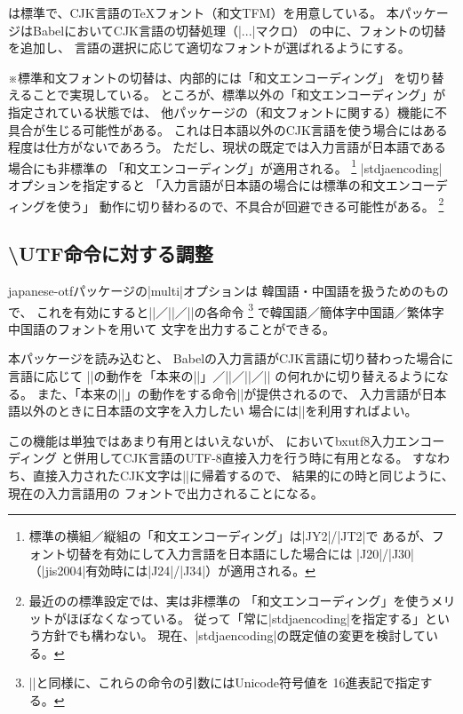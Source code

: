 \documentclass[uplatex,dvipdfmx,a4paper]{jsarticle}
\newcommand{\Pkg}[1]{\textsf{#1}}
\newcommand{\Note}{\par\noindent ※}
\newcommand{\XS}{\hspace{\xkanjiskip}}
\begin{document}
{\upTeX}は標準で、CJK言語の{\TeX}フォント（和文TFM）を用意している。
本パッケージはBabelにおいてCJK言語の切替処理（|\extras...|\XS マクロ）
の中に、フォントの切替を追加し、
言語の選択に応じて適切なフォントが選ばれるようにする。

\Note 標準和文フォントの切替は、内部的には「和文エンコーディング」
を切り替えることで実現している。
ところが、標準以外の「和文エンコーディング」が指定されている状態では、
他パッケージの（和文フォントに関する）機能に不具合が生じる可能性がある。
これは日本語以外のCJK言語を使う場合にはある程度は仕方がないであろう。
ただし、現状の既定では入力言語が日本語である場合にも非標準の
「和文エンコーディング」が適用される。%
\footnote{標準の横組／縦組の「和文エンコーディング」は|JY2|/|JT2|で
  あるが、フォント切替を有効にして入力言語を日本語にした場合には
  |J20|/|J30|（|jis2004|有効時には|J24|/|J34|）が適用される。}%
|stdjaencoding| オプションを指定すると
「入力言語が日本語の場合には標準の和文エンコーディングを使う」
動作に切り替わるので、不具合が回避できる可能性がある。%
\footnote{最近の{\upLaTeX}の標準設定では、実は非標準の
「和文エンコーディング」を使うメリットがほぼなくなっている。
従って「常に|stdjaencoding|を指定する」という方針でも構わない。
現在、|stdjaencoding|の既定値の変更を検討している。}

\subsection{{\textbackslash UTF}命令に対する調整}
\label{ssec:switch-utffont}

\Pkg{japanese-otf}パッケージの|multi|オプションは
韓国語・中国語を扱うためのもので、
これを有効にすると\XS|\UTFK|／|\UTFC|／|\UTFT|の各命令
\footnote{\XS|\UTF|と同様に、これらの命令の引数にはUnicode符号値を
  16進表記で指定する。}%
で韓国語／簡体字中国語／繁体字中国語のフォントを用いて
文字を出力することができる。

本パッケージを読み込むと、
Babelの入力言語がCJK言語に切り替わった場合に言語に応じて\XS
|\UTF|の動作を「本来の\XS|\UTF|」\<／|\UTFK|／|\UTFC|／|\UTFT|
の何れかに切り替えるようになる。
また、「本来の\XS|\UTF|」の動作をする命令\XS|\UTFJ|が提供されるので、
入力言語が日本語以外のときに日本語の文字を入力したい
場合には\XS|\UTFJ|を利用すればよい。

この機能は単独ではあまり有用とはいえないが、
{\pLaTeX}において\Pkg{bxutf8}入力エンコーディング
と併用してCJK言語のUTF-8直接入力を行う時に有用となる。
すなわち、直接入力されたCJK文字は\XS|\UTF|に帰着するので、
結果的に{\upLaTeX}の時と同じように、現在の入力言語用の
フォントで出力されることになる。
\end{document}

